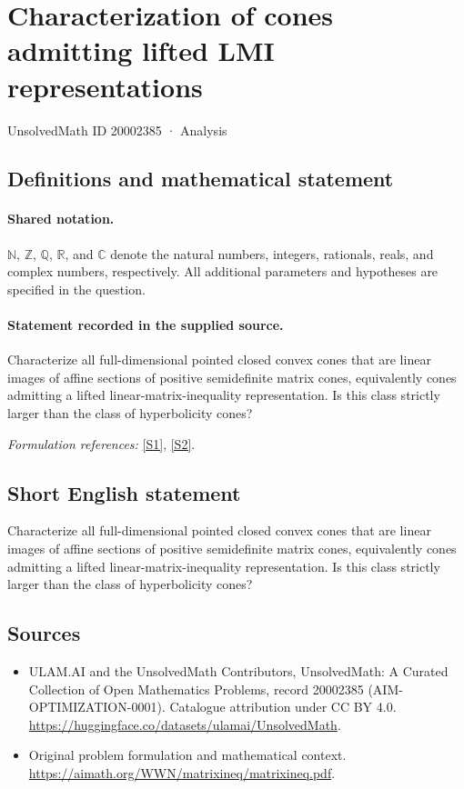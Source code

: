 \documentclass[11pt]{article}
\newcommand{\sref}[2]{\hyperlink{source:#1:#2}{[S#2]}}
\begin{document}
\setcounter{section}{20002384}
\section{Characterization of cones admitting lifted LMI representations}\label{20002385}
{\small UnsolvedMath ID 20002385 · Analysis}
\subsection{Definitions and mathematical statement}

\paragraph{Shared notation.}$\mathbb N$, $\mathbb Z$, $\mathbb Q$, $\mathbb R$, and $\mathbb C$ denote the natural numbers, integers, rationals, reals, and complex numbers, respectively. All additional parameters and hypotheses are specified in the question.


\paragraph{Statement recorded in the supplied source.}
Characterize all full-dimensional pointed closed convex cones that are linear images of affine sections of positive semidefinite matrix cones, equivalently cones admitting a lifted linear-matrix-inequality representation. Is this class strictly larger than the class of hyperbolicity cones?
\par\smallskip\textit{Formulation references:} \sref{20002385}{1}, \sref{20002385}{2}.
\subsection{Short English statement}
Characterize all full-dimensional pointed closed convex cones that are linear images of affine sections of positive semidefinite matrix cones, equivalently cones admitting a lifted linear-matrix-inequality representation. Is this class strictly larger than the class of hyperbolicity cones?
\subsection{Sources}
\begin{itemize}
\item[\hypertarget{source:20002385:1}{S1}] ULAM.AI and the UnsolvedMath Contributors, UnsolvedMath: A Curated Collection of Open Mathematics Problems, record 20002385 (AIM-OPTIMIZATION-0001). Catalogue attribution under CC BY 4.0.
\url{https://huggingface.co/datasets/ulamai/UnsolvedMath}.
\item[\hypertarget{source:20002385:2}{S2}] Original problem formulation and mathematical context.
\url{https://aimath.org/WWN/matrixineq/matrixineq.pdf}.
\end{itemize}
\label{end:20002385}
\end{document}
